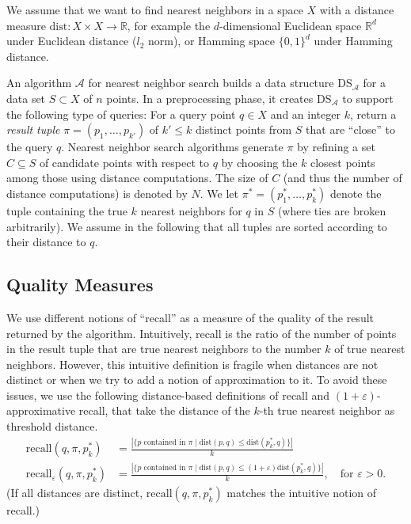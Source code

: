 We assume that we want to find nearest neighbors in a space $X$ with a distance measure $\text{dist}\colon X\times X \rightarrow \mathbb{R}$, for example the $d$-dimensional 
Euclidean space $\mathbb{R}^d$ under Euclidean distance ($l_2$ norm), or %
Hamming space $\{0,1\}^d$ under Hamming distance.

An algorithm $\mathcal{A}$ for nearest neighbor search builds a data structure DS$_\mathcal{A}$ for a data set $S \subset X$ of $n$ points. In a preprocessing phase, it creates DS$_\mathcal{A}$ 
to support the following type of queries: For a query point $q \in X$ and an integer $k$, return a \emph{result tuple} $\pi = (p_1, \ldots, p_{k'})$ of $k' \leq k$ distinct points from $S$ 
that are ``close'' to the query $q$. Nearest neighbor search algorithms generate $\pi$ by refining a set $C \subseteq S$ of 
candidate points with respect to $q$ by choosing the $k$ closest points among those using distance computations. The size of $C$ (and thus the number of distance computations) is denoted by $N$. We let $\pi^\ast = (p^\ast_1, \ldots, p^\ast_k)$ denote the tuple containing the true $k$ nearest neighbors for $q$ in $S$ (where ties are broken arbitrarily). We 
assume in the following that all tuples are sorted according to their distance to $q$.  

\subsection{Quality Measures}

We use different notions of ``recall'' as a measure of the quality of the result returned by the algorithm. 
Intuitively, recall is the ratio of the number of points in the result tuple that are true nearest neighbors to the number $k$ of true nearest neighbors. However, this intuitive 
definition is fragile when distances are not distinct or when we try to add a notion of approximation to it. To avoid these issues, we use 
the following distance-based definitions of recall and $(1+\varepsilon)$-approximative recall, that take the distance 
of the $k$-th  true nearest neighbor as threshold distance. 
%
\begin{align*}
\text{recall}(q, \pi, p^\ast_k) &= \frac{|\{p \text{ contained in $\pi$} \mid \text{dist}(p,q) \leq \text{dist}(p^\ast_k,q)\}|}{k}\\
\text{recall}_\varepsilon(q, \pi, p^\ast_k) &= \frac{|\{p \text{ contained in $\pi$} \mid \text{dist}(p,q) \leq (1 + \varepsilon) \text{dist}(p^\ast_k,q)\}|}{k}, \quad\text{for $\varepsilon > 0$.}
\end{align*}
(If all distances are distinct, $\text{recall}(q, \pi, p^\ast_k)$ matches the intuitive notion of recall.)

